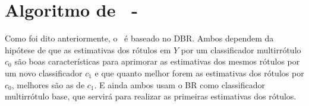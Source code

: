 \section{Algoritmo de \MRLM~-~\MRLMa}
\label{sec:mrlm_algo}
Como foi dito anteriormente, o \MRLM~é baseado no DBR. 
Ambos dependem da hipótese de que as estimativas dos rótulos em $Y$ por um classificador multirrótulo $c_0$
são boas características para aprimorar as estimativas dos mesmos rótulos por um novo classificador $c_1$
e que quanto melhor forem as estimativas dos rótulos por $c_0$, melhores são as de $c_1$.
E ainda ambos usam o BR como classificador multirrótulo base, que servirá para realizar as primeiras estimativas dos 
rótulos.

